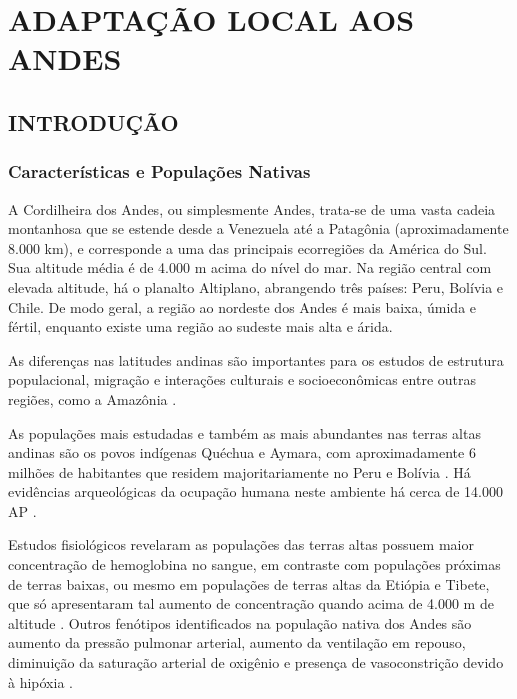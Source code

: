 \chapter{ADAPTAÇÃO LOCAL AOS ANDES}
\label{chap:andes}

\section{INTRODUÇÃO}
\label{sec:andes_intro}

\subsection{Características e Populações Nativas}

A Cordilheira dos Andes, ou simplesmente Andes, trata-se de uma vasta cadeia montanhosa que se estende desde a Venezuela até a Patagônia (aproximadamente 8.000 km), e corresponde a uma das principais ecorregiões da América do Sul. Sua altitude média é de 4.000 m acima do nível do mar. Na região central com elevada altitude, há o planalto Altiplano, abrangendo três países: Peru, Bolívia e Chile. De modo geral, a região ao nordeste dos Andes é mais baixa, úmida e fértil, enquanto existe uma região ao sudeste mais alta e árida. 

As diferenças nas latitudes andinas são importantes para os estudos de estrutura populacional, migração e interações culturais e socioeconômicas entre outras regiões, como a Amazônia \cite{borda_genetic_2020}.

As populações mais estudadas e também as mais abundantes nas terras altas andinas são os povos indígenas Quéchua e Aymara, com aproximadamente 6 milhões de habitantes que residem majoritariamente no Peru e Bolívia \cite{julian_human_2019}.  Há evidências arqueológicas da ocupação humana neste ambiente há cerca de 14.000 AP \cite{rademaker_paleoindian_2014}.

Estudos fisiológicos revelaram as populações das terras altas possuem maior concentração de hemoglobina no sangue, em contraste com populações próximas de terras baixas, ou mesmo em populações de terras altas da Etiópia e Tibete, que só apresentaram tal aumento de concentração quando acima de 4.000 m de altitude \cite{jeong_adaptations_2014}. Outros fenótipos identificados na população nativa dos Andes são aumento da pressão pulmonar arterial, aumento da ventilação em repouso, diminuição da saturação arterial de oxigênio e presença de vasoconstrição devido à hipóxia \cite{jeong_adaptations_2014}.

